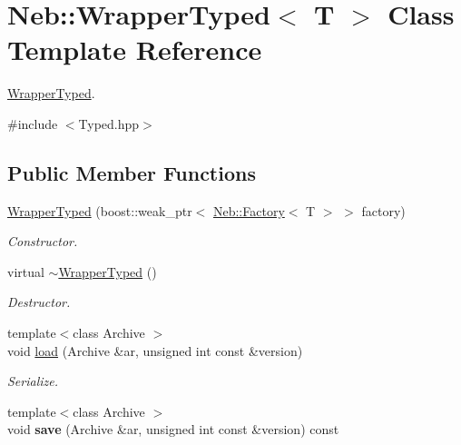 \hypertarget{classNeb_1_1WrapperTyped}{\section{\-Neb\-:\-:\-Wrapper\-Typed$<$ \-T $>$ \-Class \-Template \-Reference}
\label{classNeb_1_1WrapperTyped}
}


\hyperlink{classNeb_1_1WrapperTyped}{\-Wrapper\-Typed}.  




{\ttfamily \#include $<$\-Typed.\-hpp$>$}

\subsection*{\-Public \-Member \-Functions}
\begin{DoxyCompactItemize}
\item 
\hypertarget{classNeb_1_1WrapperTyped_affd6a7fcbeb1df7b5923d304c41089bd}{\hyperlink{classNeb_1_1WrapperTyped_affd6a7fcbeb1df7b5923d304c41089bd}{\-Wrapper\-Typed} (boost\-::weak\-\_\-ptr$<$ \hyperlink{classNeb_1_1Factory}{\-Neb\-::\-Factory}$<$ \-T $>$ $>$ factory)}\label{classNeb_1_1WrapperTyped_affd6a7fcbeb1df7b5923d304c41089bd}

\begin{DoxyCompactList}\small\item\em \-Constructor. \end{DoxyCompactList}\item 
\hypertarget{classNeb_1_1WrapperTyped_acca2803bb2a5c1ca4b3b5ff51a04b421}{virtual \hyperlink{classNeb_1_1WrapperTyped_acca2803bb2a5c1ca4b3b5ff51a04b421}{$\sim$\-Wrapper\-Typed} ()}\label{classNeb_1_1WrapperTyped_acca2803bb2a5c1ca4b3b5ff51a04b421}

\begin{DoxyCompactList}\small\item\em \-Destructor. \end{DoxyCompactList}\item 
\hypertarget{classNeb_1_1WrapperTyped_a293a6083747b145c8b9db4a9f1410f89}{{\footnotesize template$<$class Archive $>$ }\\void \hyperlink{classNeb_1_1WrapperTyped_a293a6083747b145c8b9db4a9f1410f89}{load} (\-Archive \&ar, unsigned int const \&version)}\label{classNeb_1_1WrapperTyped_a293a6083747b145c8b9db4a9f1410f89}

\begin{DoxyCompactList}\small\item\em \-Serialize. \end{DoxyCompactList}\item 
\hypertarget{classNeb_1_1WrapperTyped_a756a81384782fe7820f383ea989c9ec1}{{\footnotesize template$<$class Archive $>$ }\\void {\bfseries save} (\-Archive \&ar, unsigned int const \&version) const }\label{classNeb_1_1WrapperTyped_a756a81384782fe7820f383ea989c9ec1}


\end{DoxyCompactItemize}
